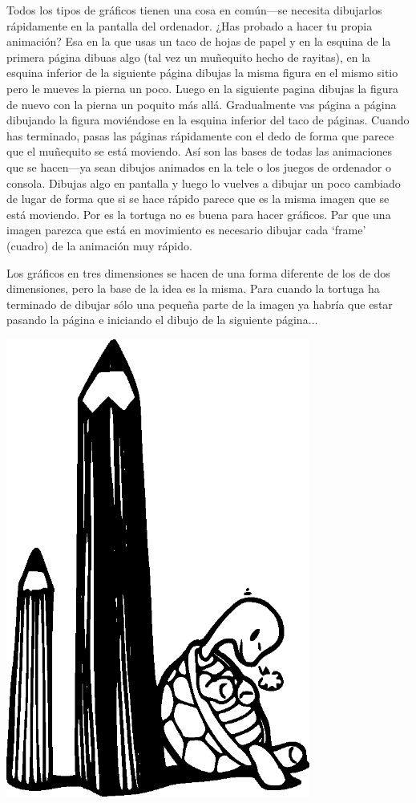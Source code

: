 Todos los tipos de gráficos tienen una cosa en común---se necesita dibujarlos rápidamente en la pantalla del ordenador.  ¿Has probado a hacer tu propia animación?  Esa en la que usas un taco de hojas de papel y en la esquina de la primera página dibuas algo (tal vez un muñequito hecho de rayitas), en la esquina inferior de la siguiente página dibujas la misma figura en el mismo sitio pero le mueves la pierna un poco. Luego en la siguiente pagina dibujas la figura de nuevo con la pierna un poquito más allá. Gradualmente vas página a página dibujando la figura moviéndose en la esquina inferior del taco de páginas.  Cuando has terminado, pasas las páginas rápidamente con el dedo de forma que parece que el muñequito se está moviendo.  Así son las bases de todas las animaciones que se hacen---ya sean dibujos animados en la tele o los juegos de ordenador o consola.  Dibujas algo en pantalla y luego lo vuelves a dibujar un poco cambiado de lugar de forma que si se hace rápido parece que es la misma imagen que se está moviendo. Por es la tortuga no es buena para hacer gráficos.  Par que una imagen parezca que está en movimiento es necesario dibujar cada `frame' (cuadro) de la animación muy rápido. 
\par
Los gráficos en tres dimensiones se hacen de una forma diferente de los de dos dimensiones, pero la base de la idea es la misma.  Para cuando la tortuga ha terminado de dibujar sólo una pequeña parte de la imagen ya habría que estar pasando la página e iniciando el dibujo de la siguiente página$\ldots$

\begin{center}
\includegraphics*[width=100mm]{turtle1.eps}
\end{center}

